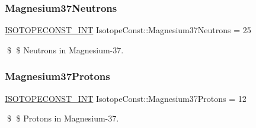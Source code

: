 \subsubsection{\texorpdfstring{Magnesium37\+Neutrons}{Magnesium37Neutrons}}
{\footnotesize\ttfamily \mbox{\hyperlink{group___isotope_const-_macros_ga5f18360b3e99483a35c32d789e62621c}{I\+S\+O\+T\+O\+P\+E\+C\+O\+N\+S\+T\+\_\+\+I\+NT}} Isotope\+Const\+::\+Magnesium37\+Neutrons = 25}

\$ \$ Neutrons in Magnesium-\/37. \mbox{\label{group___isotope_const-_magnesium-_mg37_ga5f0e20253ed10f2abdaf6b072b465932}} 
\subsubsection{\texorpdfstring{Magnesium37\+Protons}{Magnesium37Protons}}
{\footnotesize\ttfamily \mbox{\hyperlink{group___isotope_const-_macros_ga5f18360b3e99483a35c32d789e62621c}{I\+S\+O\+T\+O\+P\+E\+C\+O\+N\+S\+T\+\_\+\+I\+NT}} Isotope\+Const\+::\+Magnesium37\+Protons = 12}

\$ \$ Protons in Magnesium-\/37. 